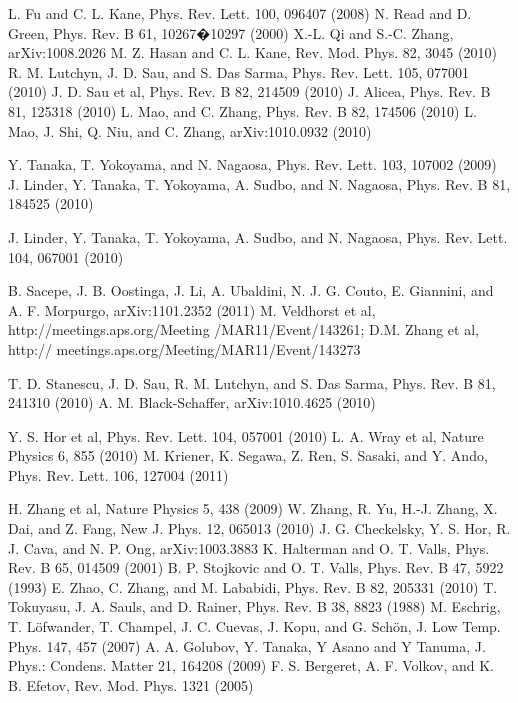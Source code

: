 \documentclass[11pt]{report}
\begin{document}

\begin{thebibliography}{29}


 L. Fu and C. L. Kane,
Phys. Rev. Lett. 100, 096407 (2008)
 N. Read and D. Green, Phys. Rev. B 61, 10267�10297 (2000)
X.-L. Qi and S.-C. Zhang, arXiv:1008.2026
 M. Z. Hasan and C. L. Kane, Rev. Mod. Phys. 82, 3045 (2010)
 R. M. Lutchyn, J. D. Sau, and S. Das Sarma,
Phys. Rev. Lett. 105, 077001 (2010)
 J. D. Sau et al, Phys. Rev. B 82, 214509 (2010)
 J. Alicea, Phys. Rev. B 81, 125318 (2010)
 L. Mao, and C. Zhang, Phys. Rev. B 82, 174506 (2010)
 L. Mao, J. Shi, Q. Niu, and C. Zhang, arXiv:1010.0932 (2010)

 Y. Tanaka, T. Yokoyama, and N. Nagaosa, Phys. Rev. Lett. 103, 107002 (2009)
 J. Linder, Y. Tanaka, T. Yokoyama, A. Sudbo, and N. Nagaosa,
Phys. Rev. B 81, 184525 (2010)

 J. Linder, Y. Tanaka, T. Yokoyama, A. Sudbo, and N. Nagaosa,
 Phys. Rev. Lett. 104, 067001 (2010)

 B. Sacepe, J. B. Oostinga, J. Li, A. Ubaldini, N. J. G. Couto, E. Giannini, and A. F. Morpurgo,
arXiv:1101.2352 (2011)
M. Veldhorst et al, http://meetings.aps.org/Meeting
/MAR11/Event/143261;
D.M. Zhang et al, http://
meetings.aps.org/Meeting/MAR11/Event/143273

T. D. Stanescu, J. D. Sau, R. M. Lutchyn, and S. Das Sarma,
Phys. Rev. B 81, 241310 (2010)
 A. M. Black-Schaffer, arXiv:1010.4625 (2010)

 Y. S. Hor et al, Phys. Rev. Lett. 104, 057001 (2010)
 L. A. Wray et al, Nature Physics 6, 855 (2010)
 M. Kriener, K. Segawa, Z. Ren, S. Sasaki, and Y. Ando,
Phys. Rev. Lett. 106, 127004 (2011)

 H. Zhang et al, Nature Physics 5, 438 (2009)
 W. Zhang, R. Yu, H.-J. Zhang, X. Dai, and Z. Fang, New J. Phys. 12, 065013 (2010)
J. G. Checkelsky, Y. S. Hor, R. J. Cava, and N. P. Ong, arXiv:1003.3883
K. Halterman and O. T. Valls, Phys. Rev. B 65,  014509 (2001)
B. P. Stojkovic and O. T. Valls, Phys. Rev. B 47, 5922 (1993)
E. Zhao, C. Zhang, and M. Lababidi, Phys. Rev. B 82, 205331 (2010) 
T. Tokuyasu, J. A. Sauls, and D. Rainer, Phys. Rev. B 38, 8823 (1988)
M. Eschrig, T. L\"ofwander, T. Champel, J. C. Cuevas, J. Kopu, and G. Sch\"on,
J. Low Temp. Phys. 147, 457 (2007)
A. A. Golubov, Y. Tanaka, Y Asano and Y Tanuma, J. Phys.: Condens. Matter 21, 164208 (2009)
F. S. Bergeret, A. F. Volkov, and K. B. Efetov, Rev. Mod. Phys. 1321 (2005)




\end{thebibliography}
\end{document}
